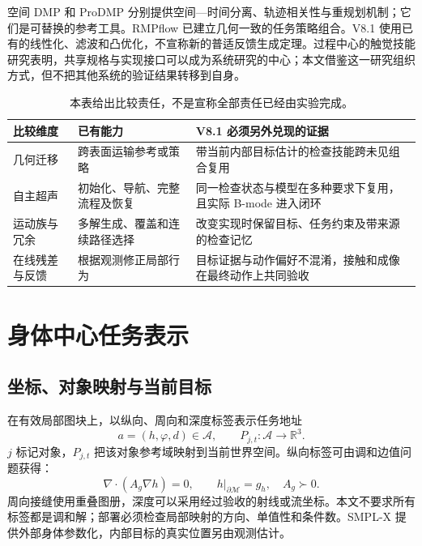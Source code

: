 \documentclass[UTF8,11pt,a4paper,fontset=fandol]{ctexart}
\numberwithin{equation}{section}
\theoremstyle{definition}
\newcommand{\R}{\mathbb R}
\begin{document}
空间 DMP 和 ProDMP 分别提供空间—时间分离、轨迹相关性与重规划机制\cite{aldmp,prodmp}；它们是可替换的参考工具。RMPflow 已建立几何一致的任务策略组合\cite{rmpflow}。V8.1 使用已有的线性化、滤波和凸优化，不宣称新的普适反馈生成定理。过程中心的触觉技能研究表明，共享规格与实现接口可以成为系统研究的中心\cite{taxonomy}；本文借鉴这一研究组织方式，但不把其他系统的验证结果转移到自身。

\begin{table}[htbp]
\centering\small
\begin{tabularx}{\linewidth}{P{28mm}YY}
\toprule
比较维度 & 已有能力 & V8.1 必须另外兑现的证据\\\midrule
几何迁移 & 跨表面运输参考或策略 & 带当前内部目标估计的检查技能跨未见组合复用\\
自主超声 & 初始化、导航、完整流程及恢复 & 同一检查状态与模型在多种要求下复用，且实际 B-mode 进入闭环\\
运动族与冗余 & 多解生成、覆盖和连续路径选择 & 改变实现时保留目标、任务约束及带来源的检查记忆\\
在线残差与反馈 & 根据观测修正局部行为 & 目标证据与动作偏好不混淆，接触和成像在最终动作上共同验收\\\bottomrule
\end{tabularx}
\caption{本表给出比较责任，不是宣称全部责任已经由实验完成。}
\end{table}

\section{身体中心任务表示}
\label{sec:representation}
\subsection{坐标、对象映射与当前目标}
在有效局部图块上，以纵向、周向和深度标签表示任务地址
\begin{equation}
a=(h,\varphi,d)\in\mathcal A,\qquad
P_{j,t}:\mathcal A\rightarrow\R^3 .
\label{eq:map}
\end{equation}
$j$ 标记对象，$P_{j,t}$ 把该对象参考域映射到当前世界空间。纵向标签可由调和边值问题获得：
\begin{equation}
\nabla\cdot(A_g\nabla h)=0,\qquad h|_{\partial\mathcal M}=g_h,
\quad A_g\succ0.
\label{eq:harmonic}
\end{equation}
周向接缝使用重叠图册，深度可以采用经过验收的射线或流坐标。本文不要求所有标签都是调和解；部署必须检查局部映射的方向、单值性和条件数。SMPL-X 提供外部身体参数化\cite{smplx}，内部目标的真实位置另由观测估计。
\end{document}
